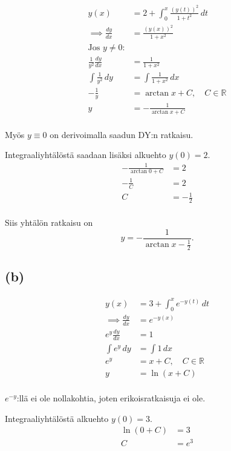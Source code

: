 \documentclass{article}
\begin{document}
\begin{align*}
  y(x) &= 2 + \int_0^x \frac{(y(t))^2}{1 + t^2}\,dt \\
  \implies \frac{dy}{dx} &= \frac{(y(x))^2}{1 + x^2} \\
  \text{Jos $y \neq 0$:} \\
  \frac{1}{y^2}\frac{dy}{dx} &= \frac{1}{1 + x^2} \\
  \int \frac{1}{y^2}\,dy &= \int \frac{1}{1 + x^2}\,dx \\
  -\frac{1}{y} &= \arctan x + C, \quad C \in \mathbb{R} \\
  y &= -\frac{1}{\arctan x + C} \\
\end{align*}

Myös $y \equiv 0$ on derivoimalla saadun DY:n ratkaisu.

Integraaliyhtälöstä saadaan lisäksi alkuehto $y(0) = 2$.
\begin{align*}
  -\frac{1}{\arctan 0 + C} &= 2 \\
  -\frac{1}{C} &= 2 \\
  C &= -\frac{1}{2} \\
\end{align*}

Siis yhtälön ratkaisu on
\[
  y = -\frac{1}{\arctan x - \frac{1}{2}}.
\]

\subsection*{(b)}

\begin{align*}
  y(x) &= 3 + \int_0^x e^{-y(t)}\,dt \\
  \implies \frac{dy}{dx} &= e^{-y(x)} \\
  e^y \frac{dy}{dx} &= 1 \\
  \int e^y\,dy &= \int 1\,dx \\
  e^y &= x + C, \quad C \in \mathbb{R} \\
  y &= \ln(x + C) \\
\end{align*}

$e^{-y}$:llä ei ole nollakohtia, joten erikoisratkaisuja ei ole.

Integraaliyhtälöstä alkuehto $y(0) = 3$.
\begin{align*}
  \ln(0 + C) &= 3 \\
  C &= e^3 \\
\end{align*}
\end{document}
